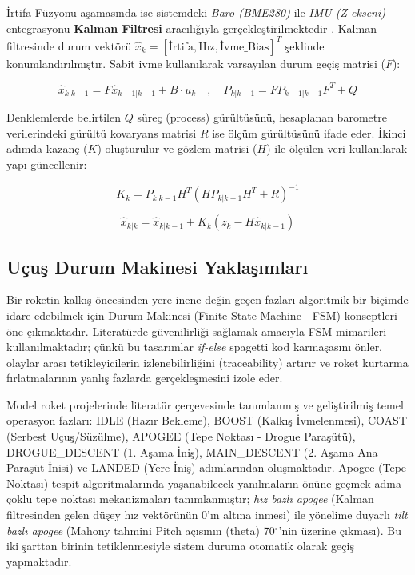 İrtifa Füzyonu aşamasında ise sistemdeki \textit{Baro (BME280)} ile \textit{IMU (Z ekseni)} entegrasyonu \textbf{Kalman Filtresi} aracılığıyla gerçekleştirilmektedir \cite{welch1995introduction}. Kalman filtresinde durum vektörü $\hat{x}_k = [ \text{İrtifa}, \text{Hız}, \text{İvme\_Bias} ]^T$ şeklinde konumlandırılmıştır. Sabit ivme kullanılarak varsayılan durum geçiş matrisi ($F$):

\begin{equation}
\hat{x}_{k|k-1} = F \hat{x}_{k-1|k-1} + B \cdot u_{k}  \quad , \quad
P_{k|k-1} = F P_{k-1|k-1} F^T + Q
\end{equation}

Denklemlerde belirtilen $Q$ süreç (process) gürültüsünü, hesaplanan barometre verilerindeki gürültü kovaryans matrisi $R$ ise ölçüm gürültüsünü ifade eder. İkinci adımda kazanç ($K$) oluşturulur ve gözlem matrisi ($H$) ile ölçülen veri kullanılarak yapı güncellenir:

\begin{equation}
K_k = P_{k|k-1} H^T (H P_{k|k-1} H^T + R)^{-1}
\end{equation}

\begin{equation}
\hat{x}_{k|k} = \hat{x}_{k|k-1} + K_k (z_k - H \hat{x}_{k|k-1})
\end{equation}

\subsection{Uçuş Durum Makinesi Yaklaşımları}
\label{ucus_durum_makinesi_yaklasimlari}

Bir roketin kalkış öncesinden yere inene değin geçen fazları algoritmik bir biçimde idare edebilmek için Durum Makinesi (Finite State Machine - FSM) konseptleri öne çıkmaktadır. Literatürde güvenilirliği sağlamak amacıyla FSM mimarileri kullanılmaktadır; çünkü bu tasarımlar \textit{if-else} spagetti kod karmaşasını önler, olaylar arası tetikleyicilerin izlenebilirliğini (traceability) artırır ve roket kurtarma fırlatmalarının yanlış fazlarda gerçekleşmesini izole eder. 

Model roket projelerinde literatür çerçevesinde tanımlanmış ve geliştirilmiş temel operasyon fazları: IDLE (Hazır Bekleme), BOOST (Kalkış İvmelenmesi), COAST (Serbest Uçuş/Süzülme), APOGEE (Tepe Noktası - Drogue Paraşütü), DROGUE\_DESCENT (1. Aşama İniş), MAIN\_DESCENT (2. Aşama Ana Paraşüt İnisi) ve LANDED (Yere İniş) adımlarından oluşmaktadır. Apogee (Tepe Noktası) tespit algoritmalarında yaşanabilecek yanılmaların önüne geçmek adına çoklu tepe noktası mekanizmaları tanımlanmıştır; \textit{hız bazlı apogee} (Kalman filtresinden gelen düşey hız vektörünün 0'ın altına inmesi) ile yönelime duyarlı \textit{tilt bazlı apogee} (Mahony tahmini Pitch açısının (theta) 70$^\circ$'nin üzerine çıkması). Bu iki şarttan birinin tetiklenmesiyle sistem duruma otomatik olarak geçiş yapmaktadır.

\clearpage